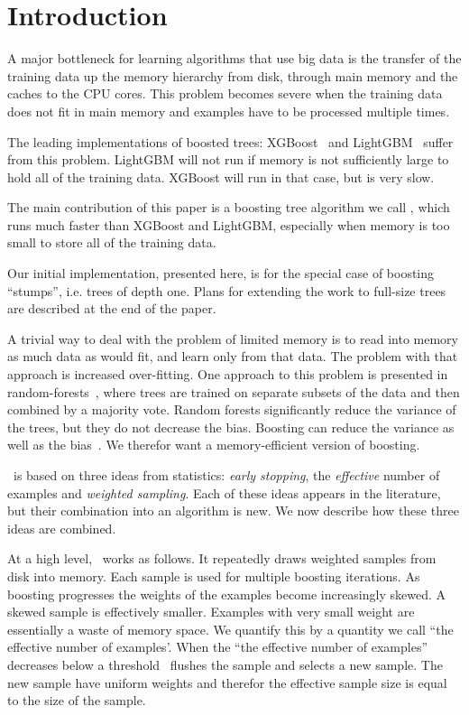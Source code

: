\section{Introduction}\label{sec:intro}
A major bottleneck for learning algorithms that use big data is the
transfer of the training data up the memory hierarchy from disk,
through main memory and the caches to the CPU cores. This problem
becomes severe when the training data does not fit in main memory and
examples have to be processed multiple times.

The leading implementations of boosted trees: XGBoost~\cite{chen_xgboost:_2016} and
LightGBM~\cite{ke_lightgbm:_2017} suffer from this problem. LightGBM
will not run if memory is not sufficiently large to hold all of the
training data. XGBoost will run in that case, but is very slow.

The main contribution of this paper is a boosting tree algorithm we
call \Sparrow, which runs much faster than XGBoost and LightGBM,
especially when memory is too small to store all of the training data.

Our initial implementation, presented here, is for the special case of
boosting ``stumps'', i.e. trees of depth one. Plans for extending the
work to full-size trees are described at the end of the paper.

A trivial way to deal with the problem of limited memory is to read
into memory as much data as would fit, and learn only from that data.
The problem with that approach is increased over-fitting. One approach
to this problem is presented in random-forests~\cite{hastie_elements_2009},
where trees are trained on separate subsets of the data and then
combined by a majority vote. Random forests significantly reduce the
variance of the trees, but they do not decrease the bias. Boosting can
reduce the variance as well as the bias~\cite{schapire_boosting_1998}. We
therefor want a memory-efficient version of boosting.

\Sparrow\ is based on three ideas from statistics: {\em early stopping},
the {\em effective} number of examples and {\em weighted
  sampling}. Each of these ideas appears in the literature, but their
combination into an algorithm is new. We now describe how these three
ideas are combined.

At a high level, \Sparrow\ works as follows. It repeatedly draws
weighted samples from disk into memory. Each sample is
used for multiple boosting iterations. As boosting progresses the
weights of the examples become increasingly skewed. A skewed sample is
effectively smaller. Examples with very small weight are essentially a
waste of memory space. We quantify this by a quantity we call ``the
effective number of examples'. When the  ``the effective number
of examples'' decreases below a threshold \Sparrow\ flushes the sample
and selects a new sample. The new sample have uniform weights and
therefor the effective sample size is equal to the size of the sample.

